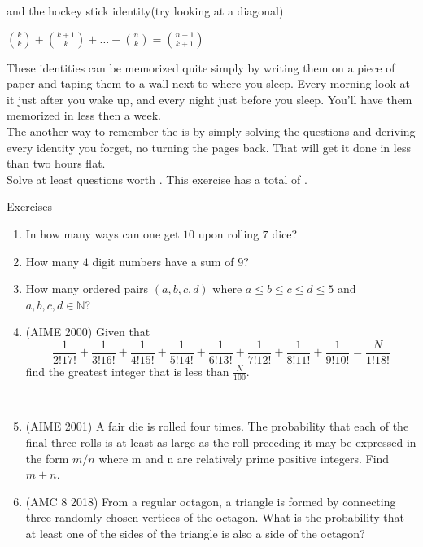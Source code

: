 and the hockey stick identity(try looking at a diagonal)
\begin{theorem}
    $\binom{k}{k}+\binom{k+1}{k}+ \dots +\binom{n}{k}=\binom{n+1}{k+1}$
\end{theorem}
These identities can be memorized quite simply by writing them on a piece of paper and taping them to a wall next to where you sleep. Every morning look at it just after you wake up, and every night just before you sleep. You'll have them memorized in less then a week.\\
The another way to remember the is by simply solving the questions and deriving every identity you forget, no turning the pages back. That will get it done in less than  two hours flat.\\
Solve at least questions worth . This exercise has a total of .
\begin{xcb}{Exercises}
\begin{enumerate}
\item {} In how many ways can one get $10$ upon rolling $7$ dice?
\item {} How many $4$ digit numbers have a sum of $9$?
\item {} How many ordered pairs $(a,b,c,d)$ where $a \le b \le c \le d \le 5$ and $a,b,c,d \in \mathbb{N}$?
\begin{hint}
\end{hint}
\item (AIME 2000)  Given that\\
\[\frac 1{2!17!}+\frac 1{3!16!}+\frac 1{4!15!}+\frac 1{5!14!}+\frac 1{6!13!}+\frac 1{7!12!}+\frac 1{8!11!}+\frac 1{9!10!}=\frac N{1!18!}\]
find the greatest integer that is less than $\frac N{100}$.
\begin{hint}
    \\
\end{hint}
\item(AIME 2001)  A fair die is rolled four times. The probability that each of the final three rolls is at least as large as the roll preceding it may be expressed in the form $m/n$ where m and n are relatively prime positive integers. Find $m + n$.
\item (AMC 8 2018)  From a regular octagon, a triangle is formed by connecting three randomly chosen vertices of the octagon. What is the probability that at least one of the sides of the triangle is also a side of the octagon?

\end{enumerate}
\end{xcb}
